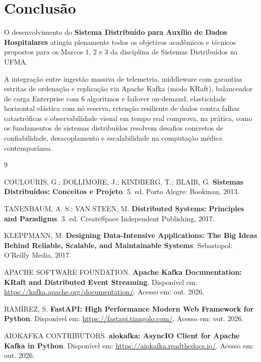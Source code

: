 \documentclass[12pt,a4paper]{article}
\begin{document}
\section{Conclusão}

O desenvolvimento do \textbf{Sistema Distribuído para Auxílio de Dados Hospitalares} atingiu plenamente todos os objetivos acadêmicos e técnicos propostos para os Marcos 1, 2 e 3 da disciplina de Sistemas Distribuídos na UFMA.

A integração entre ingestão massiva de telemetria, middleware com garantias estritas de ordenação e replicação via Apache Kafka (modo KRaft), balanceador de carga Enterprise com 6 algoritmos e failover on-demand, elasticidade horizontal elástica com nó reserva, retenção resiliente de dados contra falhas catastróficas e observabilidade visual em tempo real comprova, na prática, como os fundamentos de sistemas distribuídos resolvem desafios concretos de confiabilidade, desacoplamento e escalabilidade na computação médica contemporânea.

\newpage
\begin{thebibliography}{9}

COULOURIS, G.; DOLLIMORE, J.; KINDBERG, T.; BLAIR, G.
\textbf{Sistemas Distribuídos: Conceitos e Projeto}.
5. ed. Porto Alegre: Bookman, 2013.

TANENBAUM, A. S.; VAN STEEN, M.
\textbf{Distributed Systems: Principles and Paradigms}.
3. ed. CreateSpace Independent Publishing, 2017.

KLEPPMANN, M.
\textbf{Designing Data-Intensive Applications: The Big Ideas Behind Reliable, Scalable, and Maintainable Systems}.
Sebastopol: O'Reilly Media, 2017.

APACHE SOFTWARE FOUNDATION.
\textbf{Apache Kafka Documentation: KRaft and Distributed Event Streaming}.
Disponível em: \url{https://kafka.apache.org/documentation/}. Acesso em: out. 2026.

RAMÍREZ, S.
\textbf{FastAPI: High Performance Modern Web Framework for Python}.
Disponível em: \url{https://fastapi.tiangolo.com/}. Acesso em: out. 2026.

AIOKAFKA CONTRIBUTORS.
\textbf{aiokafka: AsyncIO Client for Apache Kafka in Python}.
Disponível em: \url{https://aiokafka.readthedocs.io/}. Acesso em: out. 2026.

\end{thebibliography}
\end{document}
